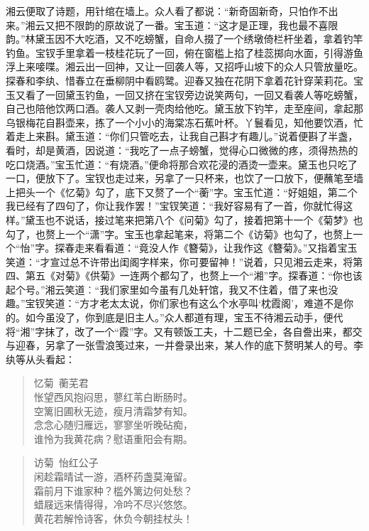 \documentclass[12pt,oneside]{book}
\newenvironment{shici}{%
\begin{verse}%
\centering\large\hspace{12pt}}%
{\end{verse}}
\begin{document}
湘云便取了诗题，用针绾在墙上。众人看了都说：“新奇固新奇，只怕作不出来。”湘云又把不限韵的原故说了一番。宝玉道：“这才是正理，我也最不喜限韵。”林黛玉因不大吃酒，又不吃螃蟹，自命人掇了一个绣墩倚栏杆坐着，拿着钓竿钓鱼。宝钗手里拿着一枝桂花玩了一回，俯在窗槛上掐了桂蕊掷向水面，引得游鱼浮上来唼喋。湘云出一回神，又让一回袭人等，又招呼山坡下的众人只管放量吃。探春和李纨、惜春立在垂柳阴中看鸥鹭。迎春又独在花阴下拿着花针穿茉莉花。宝玉又看了一回黛玉钓鱼，一回又挤在宝钗旁边说笑两句，一回又看袭人等吃螃蟹，自己也陪他饮两口酒。袭人又剥一壳肉给他吃。黛玉放下钓竿，走至座间，拿起那乌银梅花自斟壶来，拣了一个小小的海棠冻石蕉叶杯。丫鬟看见，知他要饮酒，忙着走上来斟。黛玉道：“你们只管吃去，让我自己斟才有趣儿。”说着便斟了半盏，看时，却是黄酒，因说道：“我吃了一点子螃蟹，觉得心口微微的疼，须得热热的吃口烧酒。”宝玉忙道：“有烧酒。”便命将那合欢花浸的酒烫一壶来。黛玉也只吃了一口，便放下了。宝钗也走过来，另拿了一只杯来，也饮了一口放下，便蘸笔至墙上把头一个《忆菊》勾了，底下又赘了一个“蘅”字。宝玉忙道：“好姐姐，第二个我已经有了四句了，你让我作罢！”宝钗笑道：“我好容易有了一首，你就忙得这样。”黛玉也不说话，接过笔来把第八个《问菊》勾了，接着把第十一个《菊梦》也勾了，也赘上一个“潇”字。宝玉也拿起笔来，将第二个《访菊》也勾了，也赘上一个“怡”字。探春走来看看道：“竟没人作《簪菊》，让我作这《簪菊》。”又指着宝玉笑道：“才宣过总不许带出闺阁字样来，你可要留神！”说着，只见湘云走来，将第四、第五《对菊》《供菊》一连两个都勾了，也赘上一个“湘”字。探春道：“你也该起个号。”湘云笑道︰“我们家里如今虽有几处轩馆，我又不住着，借了来也没趣。”宝钗笑道：“方才老太太说，你们家也有这么个水亭叫‘枕霞阁’，难道不是你的。如今虽没了，你到底是旧主人。”众人都道有理，宝玉不待湘云动手，便代将“湘”字抹了，改了一个“霞”字。又有顿饭工夫，十二题已全，各自誊出来，都交与迎春，另拿了一张雪浪笺过来，一并誊录出来，某人作的底下赘明某人的号。李纨等从头看起：

\begin{shici}
忆菊~蘅芜君\\
怅望西风抱闷思，蓼红苇白断肠时。\\
空篱旧圃秋无迹，瘦月清霜梦有知。\\
念念心随归雁远，寥寥坐听晚砧痴，\\
谁怜为我黄花病？慰语重阳会有期。
\end{shici}


\begin{shici}
访菊~怡红公子\\
闲趁霜晴试一游，酒杯药盏莫淹留。\\
霜前月下谁家种？槛外篱边何处愁？\\
蜡屐远来情得得，冷吟不尽兴悠悠。\\
黄花若解怜诗客，休负今朝挂杖头！
\end{shici}
\end{document}
